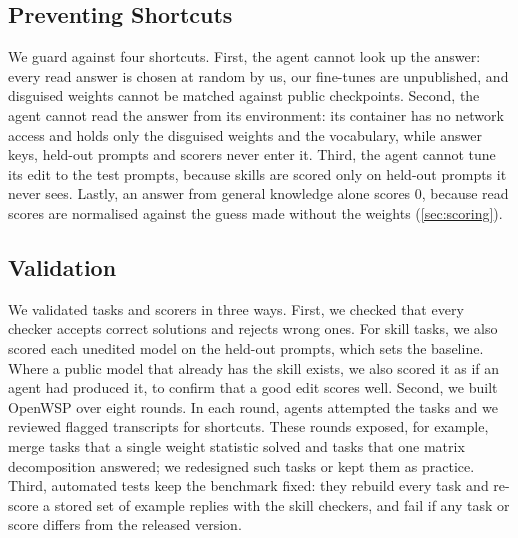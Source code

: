 \documentclass[11pt]{article}
\newcommand{\bench}{OpenWSP\xspace}
\begin{document}
\subsection{Preventing Shortcuts}\label{sec:contamination}

We guard against four shortcuts. First, the agent cannot look up the answer: every read answer
is chosen at random by us, our fine-tunes are unpublished, and disguised weights cannot be matched against public
checkpoints. Second, the agent cannot read the answer from its environment:
its container has no network access and holds only the disguised weights and the vocabulary,
while answer keys, held-out prompts and scorers never enter it. Third, the agent cannot tune
its edit to the test prompts, because skills are scored only on held-out prompts it never sees.
Lastly, an answer from general knowledge alone scores 0, because read scores are normalised
against the guess made without the weights (\cref{sec:scoring}).

\subsection{Validation}\label{sec:validation}

We validated tasks and scorers in three ways. First, we checked that every checker accepts
correct solutions and rejects wrong ones. For skill tasks, we also scored each unedited model on
the held-out prompts, which sets the baseline. Where a public model that already has the skill
exists, we also scored it as if an agent had produced it, to confirm that a good edit scores
well. Second, we built \bench over
eight rounds. In each round, agents attempted the tasks and we reviewed flagged transcripts for
shortcuts. These rounds exposed, for example, merge tasks that a single weight statistic solved
and tasks that one matrix decomposition answered; we redesigned such tasks or kept them as
practice. Third, automated tests keep the benchmark fixed: they rebuild every task and re-score a
stored set of example replies with the skill checkers, and fail if any task or score differs
from the released version.
\end{document}
